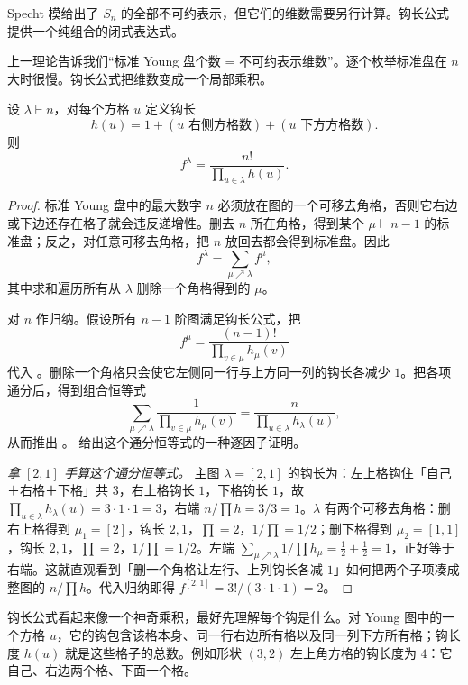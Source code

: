 Specht 模给出了 $S_n$ 的全部不可约表示，但它们的维数需要另行计算。钩长公式提供一个纯组合的闭式表达式。

上一理论告诉我们“标准 Young 盘个数 = 不可约表示维数”。逐个枚举标准盘在 $n$ 大时很慢。钩长公式把维数变成一个局部乘积。

\begin{theorem}[钩长公式]
设 $\lambda\vdash n$，对每个方格 $u$ 定义钩长
\[
h(u)=1+(u\text{ 右侧方格数})+(u\text{ 下方方格数}).
\]
则
\begin{equation}
f^\lambda
=\frac{n!}{\displaystyle\prod_{u\in\lambda}h(u)}.
\label{eq:hook-length-formula}
\end{equation}

\end{theorem}

\begin{proof}
标准 Young 盘中的最大数字 $n$ 必须放在图的一个可移去角格，否则它右边或下边还存在格子就会违反递增性。删去 $n$ 所在角格，得到某个 $\mu\vdash n-1$ 的标准盘；反之，对任意可移去角格，把 $n$ 放回去都会得到标准盘。因此
\begin{equation}
f^\lambda=\sum_{\mu\nearrow\lambda}f^\mu,
\label{eq:young-branching-count}
\end{equation}
其中求和遍历所有从 $\lambda$ 删除一个角格得到的 $\mu$。

对 $n$ 作归纳。假设所有 $n-1$ 阶图满足钩长公式，把
\[
f^\mu=\frac{(n-1)!}{\prod_{v\in\mu}h_\mu(v)}
\]
代入 。删除一个角格只会使它左侧同一行与上方同一列的钩长各减少 $1$。把各项通分后，得到组合恒等式
\[
\sum_{\mu\nearrow\lambda}
\frac{1}{\prod_{v\in\mu}h_\mu(v)}
=\frac{n}{\prod_{u\in\lambda}h_\lambda(u)},
\]
从而推出 。 给出这个通分恒等式的一种逐因子证明。

\noindent\emph{拿 $[2,1]$ 手算这个通分恒等式。} 主图 $\lambda=[2,1]$ 的钩长为：左上格钩住「自己＋右格＋下格」共 $3$，右上格钩长 $1$，下格钩长 $1$，故 $\prod_{u\in\lambda}h_\lambda(u)=3\cdot1\cdot1=3$，右端 $n/\prod h=3/3=1$。$\lambda$ 有两个可移去角格：删右上格得到 $\mu_1=[2]$，钩长 $2,1$，$\prod=2$，$1/\prod=1/2$；删下格得到 $\mu_2=[1,1]$，钩长 $2,1$，$\prod=2$，$1/\prod=1/2$。左端 $\sum_{\mu\nearrow\lambda}1/\prod h_\mu=\tfrac12+\tfrac12=1$，正好等于右端。这就直观看到「删一个角格让左行、上列钩长各减 $1$」如何把两个子项凑成整图的 $n/\prod h$。代入归纳即得 $f^{[2,1]}=3!/(3\cdot1\cdot1)=2$。
\end{proof}

钩长公式看起来像一个神奇乘积，最好先理解每个钩是什么。对 Young 图中的一个方格 $u$，它的钩包含该格本身、同一行右边所有格以及同一列下方所有格；钩长度 $h(u)$ 就是这些格子的总数。例如形状 $(3,2)$ 左上角方格的钩长度为 $4$：它自己、右边两个格、下面一个格。


